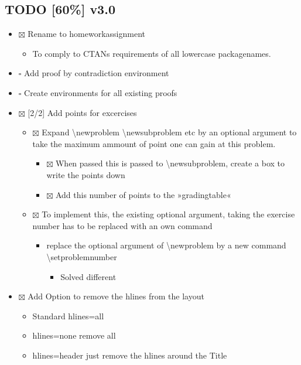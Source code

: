 \documentclass[11pt]{article}
\begin{document}
\subsection{{\bfseries\sffamily TODO} [60\%] v3.0}
\label{sec-3-1}
\begin{itemize}
\item $\boxtimes$ Rename to homeworkassignment
\begin{itemize}
\item To comply to CTANs requirements of all lowercase packagenames.
\end{itemize}
\item $\square$ Add proof by contradiction environment
\item $\square$ Create environments for all existing proofs
\item $\boxtimes$ [2/2] Add points for excercises
\begin{itemize}
\item $\boxtimes$ Expand \textbackslash{}newproblem \textbackslash{}newsubproblem etc
by an optional argument to take the maximum ammount of point one
can gain at this problem. 
\begin{itemize}
\item $\boxtimes$ When passed this is passed to \textbackslash{}newsubproblem,
create a box to write the points down
\item $\boxtimes$ Add this number of points to the »gradingtable«
\end{itemize}
\item $\boxtimes$ To implement this, the existing optional argument, taking
the exercise number has to be replaced with an own command
\begin{itemize}
\item replace the optional argument of
\textbackslash{}newproblem by a new command
\textbackslash{}setproblemnumber
\begin{itemize}
\item Solved different
\end{itemize}
\end{itemize}
\end{itemize}
\item $\boxtimes$ Add Option to remove the hlines from the layout
\begin{itemize}
\item Standard hlines=all
\item hlines=none remove all
\item hlines=header just remove the hlines around the Title
\end{itemize}

\end{itemize}
\end{document}

